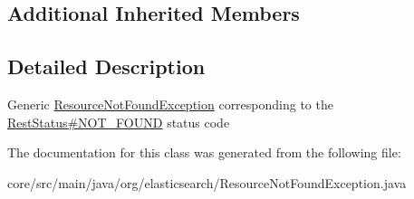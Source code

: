 \subsection*{Additional Inherited Members}


\subsection{Detailed Description}
Generic \hyperlink{classorg_1_1elasticsearch_1_1_resource_not_found_exception}{Resource\+Not\+Found\+Exception} corresponding to the \hyperlink{}{Rest\+Status\#\+N\+O\+T\+\_\+\+F\+O\+U\+ND} status code 

The documentation for this class was generated from the following file\+:\begin{DoxyCompactItemize}
\item 
core/src/main/java/org/elasticsearch/Resource\+Not\+Found\+Exception.\+java\end{DoxyCompactItemize}
